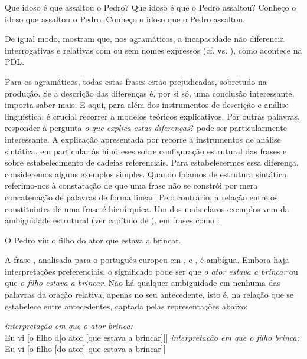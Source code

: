 \documentclass[output=paper,colorlinks,citecolor=brown,booklanguage=portuguese]{langscibook}
\begin{document}
\ea
        \ea\label{ex:cap2ex21a} Que idoso é que assaltou o Pedro?
        \ex\label{ex:cap2ex21b}Que idoso é que o Pedro assaltou?
    \z
\z
\ea
        \ea\label{ex:cap2ex22a} Conheço o idoso que assaltou o Pedro.
        \ex\label{ex:cap2ex22b} Conheço o idoso que o Pedro assaltou.
    \z
\z

De igual modo, \citeauthor{Friedmann1994} mostram que, nos agramáticos, a incapacidade não diferencia interrogativas e relativas com ou sem nomes expressos (cf.  vs. ), como acontece na PDL.

Para os agramáticos, todas estas frases estão prejudicadas, sobretudo na produção. Se a descrição das diferenças é, por si só, uma conclusão interessante, importa saber mais. E aqui, para além dos instrumentos de descrição e análise linguística, é crucial recorrer a modelos teóricos explicativos. Por outras palavras, responder à pergunta \emph{o que explica estas diferenças}? pode ser particularmente interessante. A explicação apresentada por \citet{Friedmann1994} recorre a instrumentos de análise sintática, em particular às hipóteses sobre configuração estrutural das frases e sobre estabelecimento de cadeias referenciais. Para estabelecermos essa diferença, consideremos alguns exemplos simples. Quando falamos de estrutura sintática, referimo-nos à constatação de que uma frase não se constrói por mera concatenação de palavras de forma linear. Pelo contrário, a relação entre os constituintes de uma frase é hierárquica. Um dos mais claros exemplos vem da ambiguidade estrutural (ver capítulo de ), em frases como :

\ea\label{ex:cap2ex23} O Pedro viu o filho do ator que estava a brincar.
\z

A frase , analisada para o português europeu em \citet{Brito1995}, \citet{Grillo2014} e \citet{Fernandes2020}, é ambígua. Embora haja interpretações preferenciais, o significado pode ser que \emph{o ator estava a brincar} ou que \emph{o filho estava a brincar}. Não há qualquer ambiguidade em nenhuma das palavras da oração relativa, apenas no seu antecedente, isto é, na relação que se estabelece entre antecedentes, captada pelas representações abaixo:

\ea
        \ea\label{ex:cap2ex24a} \emph{interpretação em que o ator brinca:}\\
         Eu vi [o filho d[o ator [que estava a brincar]]]
        \ex\label{ex:cap2ex24b} \emph{interpretação em que o filho brinca:}\\
         Eu vi [o filho [do ator] que estava a brincar]]
    \z
\z
\end{document}
